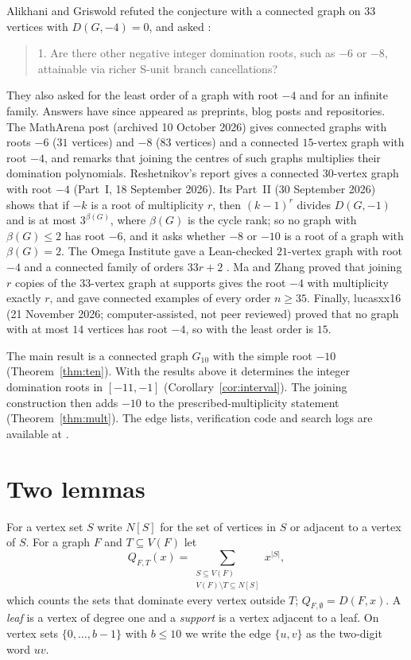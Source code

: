 \documentclass[11pt]{amsart}
\theoremstyle{remark}
\begin{document}
Alikhani and Griswold \cite{AG26} refuted the conjecture with a connected graph
on $33$ vertices with $D(G,-4)=0$, and asked \cite[Section~4]{AG26}:
\begin{quote}
1. Are there other negative integer domination roots, such as $-6$ or $-8$,
attainable via richer S-unit branch cancellations?
\end{quote}
They also asked for the least order of a graph with root $-4$ and for an
infinite family. Answers have since appeared as preprints, blog posts and
repositories. The MathArena post \cite{MA26} (archived 10 October 2026) gives
connected graphs with roots $-6$ ($31$ vertices) and $-8$ ($83$ vertices) and a
connected $15$-vertex graph with root $-4$, and remarks that joining the
centres of such graphs multiplies their domination polynomials. Reshetnikov's
report \cite{Res26} gives a connected $30$-vertex graph with root $-4$ (Part~I,
18 September 2026). Its Part~II (30 September 2026) shows that if $-k$ is a root
of multiplicity $r$, then $(k-1)^r$ divides $D(G,-1)$ and is at most
$3^{\beta(G)}$, where $\beta(G)$ is the cycle rank; so no graph with
$\beta(G)\le2$ has root $-6$, and it asks whether $-8$ or $-10$ is a root of a
graph with $\beta(G)=2$. The Omega Institute gave a Lean-checked $21$-vertex
graph with root $-4$ \cite{Om26} and a connected family of orders $33r+2$
\cite{Om26b}. Ma and Zhang \cite{MZ26} proved that joining $r$ copies of the
$33$-vertex graph at supports gives the root $-4$ with multiplicity exactly $r$,
and gave connected examples of every order $n\ge35$. Finally, lucasxx16 \cite{Luc26} (21 November 2026;
computer-assisted, not peer reviewed) proved that no graph with at most $14$
vertices has root $-4$, so with \cite{MA26} the least order is $15$.

The main result is a connected graph $G_{10}$ with the simple root $-10$
(Theorem~\ref{thm:ten}). With the results above it determines the integer
domination roots in $[-11,-1]$ (Corollary~\ref{cor:interval}). The joining
construction then adds $-10$ to the prescribed-multiplicity statement
(Theorem~\ref{thm:mult}). The edge lists, verification code and search logs are
available at \cite{Art}.

\section{Two lemmas}\label{sec:lemmas}

For a vertex set $S$ write $N[S]$ for the set of vertices in $S$ or adjacent to
a vertex of $S$. For a graph $F$ and $T\subseteq V(F)$ let
\[
  Q_{F,T}(x)=\sum_{\substack{S\subseteq V(F)\\ V(F)\setminus T\subseteq N[S]}} x^{|S|},
\]
which counts the sets that dominate every vertex outside $T$; $Q_{F,\emptyset}=D(F,x)$.
A \emph{leaf} is a vertex of degree one and a \emph{support} is a vertex
adjacent to a leaf. On vertex sets $\{0,\dots,b-1\}$ with $b\le 10$ we write the
edge $\{u,v\}$ as the two-digit word $uv$.
\end{document}
